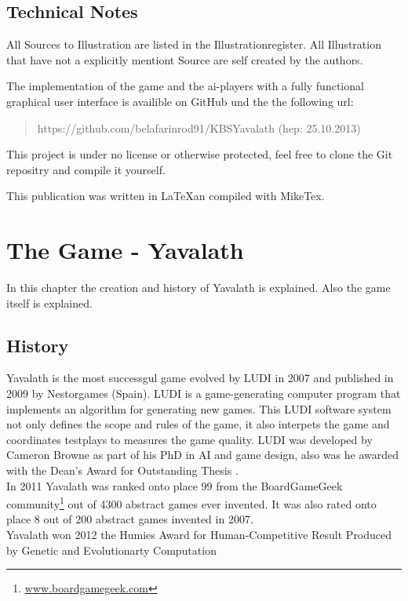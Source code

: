 \documentclass[english]{report}
\begin{document}
\section{Technical Notes}
All Sources to Illustration are listed in the Illustrationregister. All Illustration that have not a explicitly mentiont Source are self created by the authors.


The implementation of the game and the ai-players with a fully functional
graphical user interface is availible on GitHub und the the following url:
\begin{quotation}
    https://github.com/belafarinrod91/KBSYavalath (hep: 25.10.2013)
\end{quotation}
This project is under no license or otherwise protected, feel free to clone the
Git repositry and compile it yourself.


This publication was written in \LaTeX an compiled with MikeTex.

\chapter{The Game - Yavalath}
\label{sec:chapter2}
In this chapter the creation and history of Yavalath is explained. Also the game itself is explained.

\section{History}
Yavalath is the most successgul game evolved by LUDI in 2007 and published in 2009 by Nestorgames (Spain). LUDI is a game-generating computer program 
that implements an algorithm for generating new games. This LUDI software system not only defines the scope and rules of the game, it also interpets 
the game and coordinates testplays to measures the game quality.
LUDI was developed by Cameron Browne as part of his PhD in AI and game design,
also was he awarded with the Dean's Award for Outstanding Thesis
\cite{EvolutionGameDesign}. \\

In 2011 Yavalath was ranked onto place 99 from the BoardGameGeek
community\footnote{\url{www.boardgamegeek.com}} out of 4300 abstract games ever invented.
It was also rated onto place 8 out of 200 abstract games invented in 2007. \\

Yavalath won 2012 the Humies Award for Human-Competitive Result Produced by Genetic and Evolutionarty Computation
\end{document}
